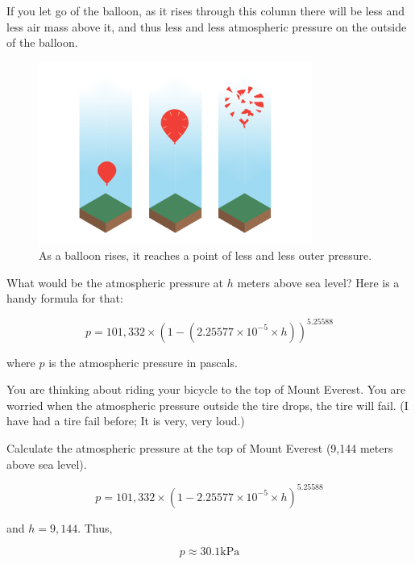 If you let go of the balloon, as it rises through this column there will be less and less air mass above it, and thus less and less atmospheric pressure on the outside of the balloon. 
\begin{figure}[htbp]
    \centering
    \includegraphics[width=0.8\textwidth]{balloonColumn.png}
    \caption{As a balloon rises, it reaches a point of less and less outer pressure.}
    \label{fig:balloonColumn}
\end{figure}

What would be the atmospheric pressure at $h$ meters above sea level?  Here is a handy formula for that:

$$p = 101,332 \times \left(1 - \left( 2.25577 \times 10^{-5} \times h\right) \right)^{5.25588}$$

where $p$ is the atmospheric pressure in pascals.

\begin{Exercise}[title={Atmospheric Pressure},  label=atmos_pressure]
  
You are thinking about riding your bicycle to the top of Mount Everest.  You are worried when the atmospheric pressure outside the tire drops,  the tire will fail.  
(I have had a tire fail before; It is very, very loud.)  

Calculate the atmospheric pressure at the top of Mount Everest (9,144 meters above sea level).

\end{Exercise}
\begin{Answer}[ref=atmos_pressure]

$$p = 101,332 \times \left(1 - 2.25577 \times 10^{-5} \times h\right)^{5.25588}$$

and $h = 9,144$.  Thus,

$$p \approx 30.1 \text{kPa}$$

\end{Answer}

